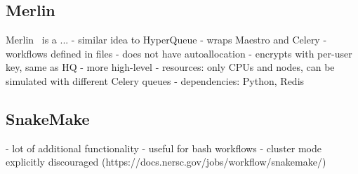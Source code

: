 \subsection*{Merlin}

Merlin~\cite{merlin} is a ...  - similar idea to%
HyperQueue
- wraps Maestro and Celery
- workflows defined in files
- does not have autoallocation
- encrypts with per-user key, same as HQ
- more high-level
- resources: only CPUs and nodes, can be simulated with different Celery queues
- dependencies: Python, Redis

\subsection*{SnakeMake}

- lot of additional functionality
- useful for bash workflows
- cluster mode explicitly discouraged (https://docs.nersc.gov/jobs/workflow/snakemake/)

